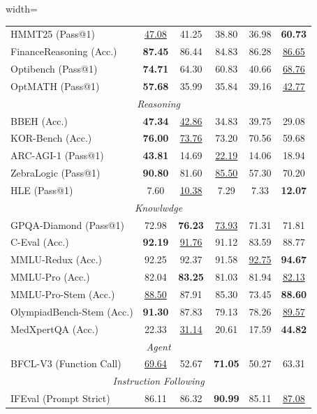 \begin{table}[t]
\begin{adjustbox}{width=\linewidth}
\begin{threeparttable}
\begin{tabular}{lccccc}
 HMMT25 (Pass@1) & \underline{47.08} & 41.25 & 38.80 & 36.98 & \textbf{60.73} \\
 FinanceReasoning (Acc.) & \textbf{87.45} & 86.44 & 84.83 & 86.28 & \underline{86.65} \\
 Optibench (Pass@1) & \textbf{74.71} & 64.30 & 60.83 & 40.66 & \underline{68.76} \\
 OptMATH (Pass@1) & \textbf{57.68} & 35.99 & 35.84 & 39.16 & \underline{42.77} \\
\midrule \multicolumn{6}{c}{\textit{Reasoning}} \\
\midrule BBEH (Acc.) & \textbf{47.34} & \underline{42.86} & 34.83 & 39.75 & 29.08 \\
 KOR-Bench (Acc.) & \textbf{76.00} & \underline{73.76} & 73.20 & 70.56 & 59.68 \\
 ARC-AGI-1 (Pass@1) & \textbf{43.81} & 14.69 & \underline{22.19} & 14.06 & 18.94 \\
 ZebraLogic (Pass@1) & \textbf{90.80} & 81.60 & \underline{85.50} & 57.30 & 70.20 \\
 HLE (Pass@1) & 7.60 & \underline{10.38} & 7.29 & 7.33 & \textbf{12.07} \\
\midrule \multicolumn{6}{c}{\textit{Knowlwdge}} \\
\midrule 
 GPQA-Diamond (Pass@1) & 72.98  & \textbf{76.23} & \underline{73.93} & 71.31 & 71.81 \\
C-Eval (Acc.) & \textbf{92.19} & \underline{91.76} & 91.12 & 83.59 & 88.77 \\
 MMLU-Redux (Acc.) & 92.25 & 92.37 & 91.58 & \underline{92.75} & \textbf{94.67} \\
 MMLU-Pro (Acc.) & 82.04 & \textbf{83.25} & 81.03 & 81.94 & \underline{82.13} \\
 MMLU-Pro-Stem (Acc.) & \underline{88.50} & 87.91 & 85.30 & 73.45 & \textbf{88.60} \\
 OlympiadBench-Stem (Acc.) & \textbf{91.30} & 87.83 & 79.13 & 78.26 & \underline{89.57} \\
MedXpertQA (Acc.) & 22.33 & \underline{31.14} & 20.61 & 17.59 & \textbf{44.82} \\	
\midrule \multicolumn{6}{c}{\textit{Agent}} \\
\midrule BFCL-V3 (Function Call) & \underline{69.64} & 52.67 & \textbf{71.05} & 50.27 & 63.31 \\
\midrule \multicolumn{6}{c}{\textit{Instruction Following}} \\
\midrule IFEval (Prompt Strict) & 86.11 & 86.32 & \textbf{90.99} & 85.11 & \underline{87.08} \\

\end{tabular}
\end{threeparttable}
\end{adjustbox}
\end{table}
